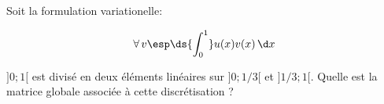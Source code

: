 \bexo

Soit la formulation variationelle:

\begin{equation}
	\forall \,v\esp  \ds{\int_0^1} u(x)v(x) \,\d x 
\end{equation}

$]0;1[$ est divisé en deux éléments linéaires sur $]0;1/3[$ et $]1/3;1[$. Quelle est la matrice globale associée à cette discrétisation ?

\eexo

\solution{

}